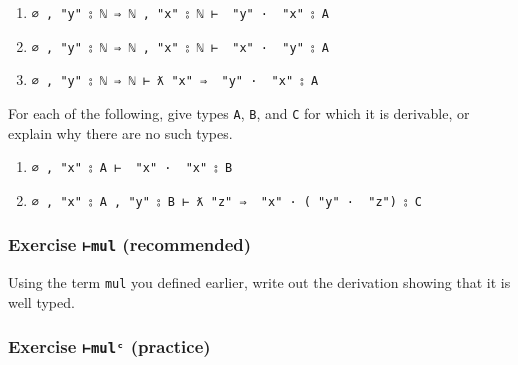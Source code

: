 \begin{enumerate}
\def\labelenumi{\arabic{enumi}.}
\tightlist
\item
  \texttt{∅\ ,\ "y"\ ⦂\ \textasciigrave{}ℕ\ ⇒\ \textasciigrave{}ℕ\ ,\ "x"\ ⦂\ \textasciigrave{}ℕ\ ⊢\ \textasciigrave{}\ "y"\ ·\ \textasciigrave{}\ "x"\ ⦂\ A}
\item
  \texttt{∅\ ,\ "y"\ ⦂\ \textasciigrave{}ℕ\ ⇒\ \textasciigrave{}ℕ\ ,\ "x"\ ⦂\ \textasciigrave{}ℕ\ ⊢\ \textasciigrave{}\ "x"\ ·\ \textasciigrave{}\ "y"\ ⦂\ A}
\item
  \texttt{∅\ ,\ "y"\ ⦂\ \textasciigrave{}ℕ\ ⇒\ \textasciigrave{}ℕ\ ⊢\ ƛ\ "x"\ ⇒\ \textasciigrave{}\ "y"\ ·\ \textasciigrave{}\ "x"\ ⦂\ A}
\end{enumerate}

For each of the following, give types \texttt{A}, \texttt{B}, and
\texttt{C} for which it is derivable, or explain why there are no such
types.

\begin{enumerate}
\def\labelenumi{\arabic{enumi}.}
\tightlist
\item
  \texttt{∅\ ,\ "x"\ ⦂\ A\ ⊢\ \textasciigrave{}\ "x"\ ·\ \textasciigrave{}\ "x"\ ⦂\ B}
\item
  \texttt{∅\ ,\ "x"\ ⦂\ A\ ,\ "y"\ ⦂\ B\ ⊢\ ƛ\ "z"\ ⇒\ \textasciigrave{}\ "x"\ ·\ (\textasciigrave{}\ "y"\ ·\ \textasciigrave{}\ "z")\ ⦂\ C}
\end{enumerate}

\hypertarget{exercise-mul-recommended-1}{%
\subsubsection{\texorpdfstring{Exercise \texttt{⊢mul}
(recommended)}{Exercise ⊢mul (recommended)}}\label{exercise-mul-recommended-1}}

Using the term \texttt{mul} you defined earlier, write out the
derivation showing that it is well typed.

\begin{fence}
\begin{code}%
\>[0]\<%
\end{code}
\end{fence}

\hypertarget{exercise-mulux1d9c-practice-1}{%
\subsubsection{\texorpdfstring{Exercise \texttt{⊢mulᶜ}
(practice)}{Exercise ⊢mulᶜ (practice)}}\label{exercise-mulux1d9c-practice-1}}

